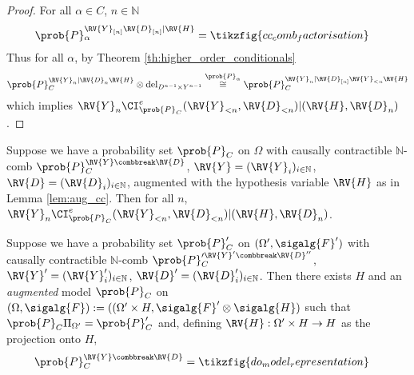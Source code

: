 \begin{proof}
For all $\alpha\in C$, $n\in \mathbb{N}$
\begin{align}
	\prob{P}_\alpha^{\RV{Y}_{[n]}\RV{D}_{[n]}|\RV{H}} &= \tikzfig{cc_comb_factorisation}
\end{align}
Thus for all $\alpha$, by Theorem \ref{th:higher_order_conditionals}
\begin{align}
	\prob{P}_C^{\RV{Y}_n|\RV{D}_n\RV{H}}\otimes \mathrm{del}_{D^{n-1}\times Y^{n-1}} \overset{\prob{P}_\alpha}{\cong} \prob{P}_C^{\RV{Y}_n|\RV{D}_{[n]}\RV{Y}_{<n}\RV{H}}
\end{align}
which implies $\RV{Y}_n\CI^e_{\prob{P}_C}(\RV{Y}_{<n},\RV{D}_{<n})|(\RV{H},\RV{D}_n)$.
\end{proof}


\begin{theorem}
Suppose we have a probability set $\prob{P}_C$ on $\Omega$ with causally contractible $\mathbb{N}$-comb $\prob{P}_C^{\RV{Y}\combbreak \RV{D}}$, $\RV{Y}=(\RV{Y}_i)_{i\in\mathbb{N}}$, $\RV{D}=(\RV{D}_i)_{i\in\mathbb{N}}$, augmented with the hypothesis variable $\RV{H}$ as in Lemma \ref{lem:aug_cc}. Then for all $n$, $\RV{Y}_n\CI^e_{\prob{P}_C}(\RV{Y}_{<n},\RV{D}_{<n})|(\RV{H},\RV{D}_n)$.
\end{theorem}

\begin{lemma}\label{lem:aug_cc}
Suppose we have a probability set $\prob{P}_C'$ on $(\Omega',\sigalg{F}')$ with causally contractible $\mathbb{N}$-comb $\prob{P}_C^{\prime \RV{Y}'\combbreak \RV{D}''}$, $\RV{Y}'=(\RV{Y}'_i)_{i\in\mathbb{N}}$, $\RV{D}'=(\RV{D}'_i)_{i\in\mathbb{N}}$. Then there exists $H$ and an \emph{augmented} model $\prob{P}_C$ on $(\Omega,\sigalg{F}):=((\Omega'\times H,\sigalg{F}'\otimes\sigalg{H})$ such that $\prob{P}_C\Pi_{\Omega'}=\prob{P}_C'$ and, defining $\RV{H}:\Omega'\times H\to H$ as the projection onto $H$,
\begin{align}
    \prob{P}_C^{\RV{Y}\combbreak \RV{D}} &= \tikzfig{do_model_representation}\label{eq:do_model_rep}
\end{align}
\end{lemma}

